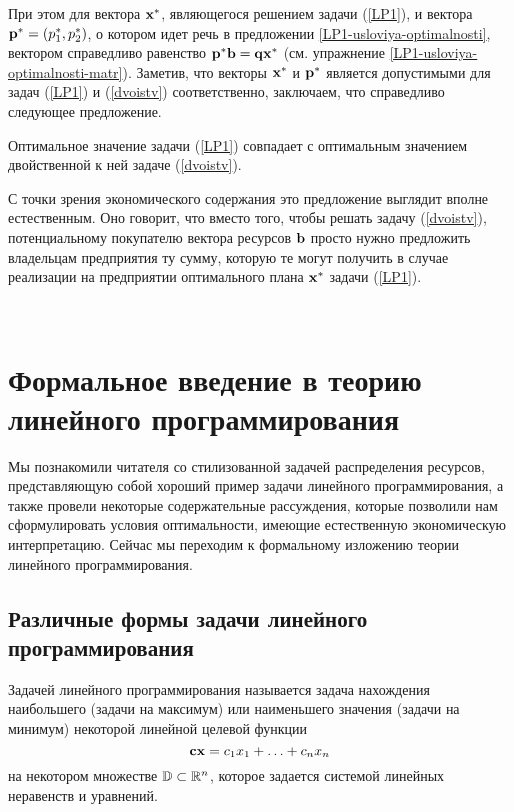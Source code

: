     При этом для вектора $\mathbf{x^{*}}$, являющегося решением задачи
    (\ref{LP1}), и вектора $\mathbf{p^{*}}=(p_{1}^{*},p_{2}^{*})$, о котором идет речь в
    предложении \ref{LP1-usloviya-optimalnosti},  вектором справедливо
    равенство $\mathbf{p^{*}}\mathbf{b}=\mathbf{q}\mathbf{x^{*}}$
    (см. упражнение \ref{LP1-usloviya-optimalnosti-matr}). Заметив, что
    векторы $\mathbf{x^{*}}$ и $\mathbf{p^{*}}$ является допустимыми для  задач
    (\ref{LP1}) и (\ref{dvoistv}) соответственно, заключаем, что
    справедливо следующее предложение.

\begin{prop}
    \label{LP1-priamaya-dvoistvennaya}
    Оптимальное значение задачи (\ref{LP1}) совпадает с оптимальным значением двойственной
    к ней задаче (\ref{dvoistv}).
\end{prop}

    С точки зрения экономического содержания это предложение выглядит
    вполне естественным. Оно говорит, что вместо того, чтобы
    решать задачу (\ref{dvoistv}), потенциальному покупателю вектора
    ресурсов $\mathbf{b}$ просто нужно предложить владельцам предприятия ту
    сумму, которую те могут получить
    в случае реализации на предприятии оптимального плана $\mathbf{x^{*}}$
    задачи (\ref{LP1}).



\

\section{Формальное введение в теорию линейного программирования}


    Мы познакомили читателя со
    стилизованной задачей распределения ресурсов,
    представляющую собой хороший пример задачи линейного
    программирования, а также провели некоторые содержательные
    рассуждения, которые позволили нам сформулировать
    условия оптимальности, имеющие естественную экономическую
    интерпретацию. Сейчас мы переходим к формальному
    изложению теории линейного программирования.









\subsection{Различные формы задачи линейного программирования}

    Задачей линейного программирования называется задача
нахождения наибольшего (задачи на максимум) или наименьшего значения (задачи на минимум)
некоторой линейной целевой функции
\[
    \mathbf{c}\mathbf{x}=c_{1}x_{1}+\ldots+c_{n}x_{n}
\]
на некотором множестве $\mathbb{D}\subset\mathbb{R}^{n}$, которое задается системой линейных неравенств и
уравнений.

